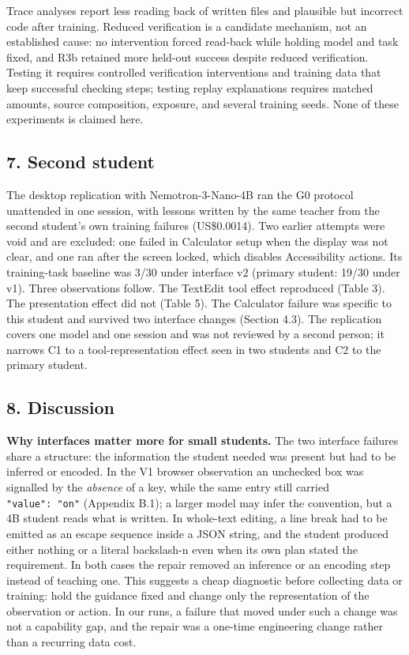 \documentclass[
  10pt,
]{article}
\begin{document}
Trace analyses report less reading back of written files and plausible
but incorrect code after training. Reduced verification is a candidate
mechanism, not an established cause: no intervention forced read-back
while holding model and task fixed, and R3b retained more held-out
success despite reduced verification. Testing it requires controlled
verification interventions and training data that keep successful
checking steps; testing replay explanations requires matched amounts,
source composition, exposure, and several training seeds. None of these
experiments is claimed here.

\subsection{7. Second student}\label{second-student}

The desktop replication with Nemotron-3-Nano-4B ran the G0 protocol
unattended in one session, with lessons written by the same teacher from
the second student's own training failures (US\$0.0014). Two earlier
attempts were void and are excluded: one failed in Calculator setup when
the display was not clear, and one ran after the screen locked, which
disables Accessibility actions. Its training-task baseline was 3/30
under interface v2 (primary student: 19/30 under v1). Three observations
follow. The TextEdit tool effect reproduced (Table 3). The presentation
effect did not (Table 5). The Calculator failure was specific to this
student and survived two interface changes (Section 4.3). The
replication covers one model and one session and was not reviewed by a
second person; it narrows C1 to a tool-representation effect seen in two
students and C2 to the primary student.

\subsection{8. Discussion}\label{discussion}

\textbf{Why interfaces matter more for small students.} The two
interface failures share a structure: the information the student needed
was present but had to be inferred or encoded. In the V1 browser
observation an unchecked box was signalled by the \emph{absence} of a
key, while the same entry still carried \texttt{"value":\ "on"}
(Appendix B.1); a larger model may infer the convention, but a 4B
student reads what is written. In whole-text editing, a line break had
to be emitted as an escape sequence inside a JSON string, and the
student produced either nothing or a literal backslash-n even when its
own plan stated the requirement. In both cases the repair removed an
inference or an encoding step instead of teaching one. This suggests a
cheap diagnostic before collecting data or training: hold the guidance
fixed and change only the representation of the observation or action.
In our runs, a failure that moved under such a change was not a
capability gap, and the repair was a one-time engineering change rather
than a recurring data cost.
\end{document}
